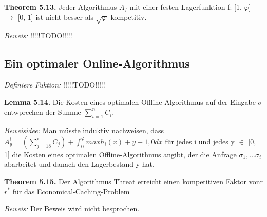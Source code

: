 \textbf{Theorem 5.13.} Jeder Algorithmus $A_{f}$ mit einer festen Lagerfunktion f: [1, $\varphi$] $\to$ [0, 1] ist nicht besser als $\sqrt{\varphi}$-kompetitiv.

\textit{Beweis:} !!!!!TODO!!!!!

\subsection{Ein optimaler Online-Algorithmus}

\textit{Definiere Fuktion:} !!!!!TODO!!!!!
 
\textbf{Lemma 5.14.} Die Kosten eines optimalen Offline-Algorithmus auf der Eingabe $\sigma$ entwprechen der Summe $\sum_{i=1}^{n} C_{i}$.

\textit{Beweisidee:} Man müsste induktiv nachweisen, dass $A_{y}^{i} = (\sum_{j=18}^{i} C_{j} ) + \int_{0}^{\varphi} max{h_{i}(x) + y - 1, 0} dx $ für jedes i und jedes y $\in$ [0, 1] die Kosten eines optimalen Offline-Algorithmus angibt, der die Anfrage $\sigma_{1}, ... \sigma_{i}$ abarbeitet und danach den Lagerbestand y hat.

\textbf{Theorem 5.15.} Der Algorithmus Threat erreicht einen kompetitiven Faktor vonr $r^{*}$ für das Economical-Caching-Problem

\textit{Beweis:} Der Beweis wird nicht besprochen.